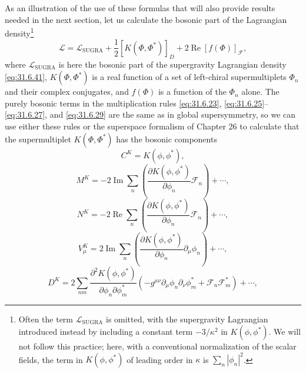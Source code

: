 As an illustration of the use of these formulas that will also provide
results needed in the next section, let us calculate the bosonic part of
the Lagrangian density\footnote{Often the term
\(\mathcal L_{\mathrm{SUGRA}}\) is omitted, with the supergravity
Lagrangian introduced instead by including a constant term
\(-3/\kappa^2\) in \(K(\phi,\phi^*)\). We will not follow this practice;
here, with a conventional normalization of the scalar fields, the term
in \(K(\phi,\phi^*)\) of leading order in \(\kappa\) is
\(\sum_n|\phi_n|^2\).}
\begin{equation}
  \mathcal L
  =\mathcal L_{\mathrm{SUGRA}}
   +\frac{1}{2}[K(\Phi,\Phi^*)]_D
   +2\operatorname{Re}[f(\Phi)]_{\mathcal F},
  \tag{31.6.49}\label{eq:31.6.49}
\end{equation}
where \(\mathcal L_{\mathrm{SUGRA}}\) is here the bosonic part of the
supergravity Lagrangian density \eqref{eq:31.6.41},
\(K(\Phi,\Phi^*)\) is a real function of a set of left-chiral
supermultiplets \(\Phi_n\) and their complex conjugates, and \(f(\Phi)\)
is a function of the \(\Phi_n\) alone. The purely bosonic terms in the
multiplication rules \eqref{eq:31.6.23},
\eqref{eq:31.6.25}--\eqref{eq:31.6.27}, and \eqref{eq:31.6.29} are the
same as in global supersymmetry, so we can use either these rules or the
superspace formalism of Chapter 26 to calculate that the supermultiplet
\(K(\Phi,\Phi^*)\) has the bosonic components
\begin{equation}
  C^K=K(\phi,\phi^*),
  \tag{31.6.50}\label{eq:31.6.50}
\end{equation}
\begin{equation}
  M^K=-2\operatorname{Im}\sum_n\left(
    \frac{\partial K(\phi,\phi^*)}{\partial\phi_n}\mathcal F_n
  \right)+\cdots,
  \tag{31.6.51}\label{eq:31.6.51}
\end{equation}
\begin{equation}
  N^K=-2\operatorname{Re}\sum_n\left(
    \frac{\partial K(\phi,\phi^*)}{\partial\phi_n}\mathcal F_n
  \right)+\cdots,
  \tag{31.6.52}\label{eq:31.6.52}
\end{equation}
\begin{equation}
  V_\mu^K=2\operatorname{Im}\sum_n\left(
    \frac{\partial K(\phi,\phi^*)}{\partial\phi_n}\partial_\mu\phi_n
  \right)+\cdots,
  \tag{31.6.53}\label{eq:31.6.53}
\end{equation}
\begin{equation}
  D^K
  =2\sum_{nm}
    \frac{\partial^2K(\phi,\phi^*)}
         {\partial\phi_n\partial\phi_m^*}
    \left(
      -g^{\mu\nu}\partial_\mu\phi_n\partial_\nu\phi_m^*
      +\mathcal F_n\mathcal F_m^*
    \right)+\cdots,
  \tag{31.6.54}\label{eq:31.6.54}
\end{equation}
